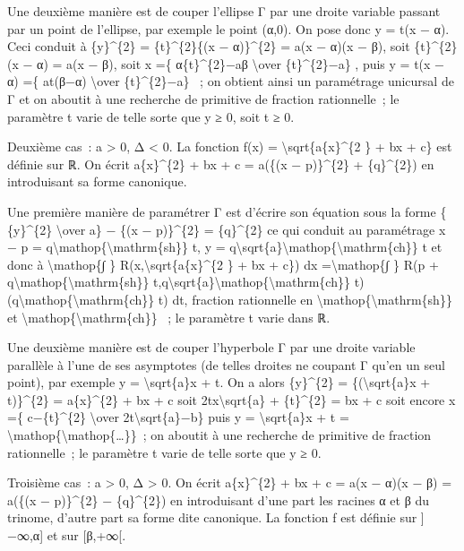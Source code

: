 \documentclass[]{article}
\begin{document}
Une deuxième manière est de couper l'ellipse Γ par une droite variable
passant par un point de l'ellipse, par exemple le point (α,0). On pose
donc y = t(x − α). Ceci conduit à \{y\}\^{}\{2\} = \{t\}\^{}\{2\}\{(x −
α)\}\^{}\{2\} = a(x − α)(x − β), soit \{t\}\^{}\{2\}(x − α) = a(x − β),
soit x =\{ α\{t\}\^{}\{2\}−aβ \textbackslash{}over \{t\}\^{}\{2\}−a\} ,
puis y = t(x − α) =\{ at(β−α) \textbackslash{}over \{t\}\^{}\{2\}−a\} ~;
on obtient ainsi un paramétrage unicursal de Γ et on aboutit à une
recherche de primitive de fraction rationnelle~; le paramètre t varie de
telle sorte que y ≥ 0, soit t ≥ 0.

Deuxième cas~: a \textgreater{} 0, Δ \textless{} 0. La fonction f(x) =
\textbackslash{}sqrt\{a\{x\}\^{}\{2 \} + bx + c\} est définie sur ℝ. On
écrit a\{x\}\^{}\{2\} + bx + c = a(\{(x − p)\}\^{}\{2\} +
\{q\}\^{}\{2\}) en introduisant sa forme canonique.

Une première manière de paramétrer Γ est d'écrire son équation sous la
forme \{ \{y\}\^{}\{2\} \textbackslash{}over a\} − \{(x − p)\}\^{}\{2\}
= \{q\}\^{}\{2\} ce qui conduit au paramétrage x − p =
q\textbackslash{}mathop\{\textbackslash{}mathrm\{sh\}\} t, y =
q\textbackslash{}sqrt\{a\}\textbackslash{}mathop\{\textbackslash{}mathrm\{ch\}\}
t et donc à \textbackslash{}mathop\{∫ \}
R(x,\textbackslash{}sqrt\{a\{x\}\^{}\{2 \} + bx + c\}) dx
=\textbackslash{}mathop\{∫ \} R(p +
q\textbackslash{}mathop\{\textbackslash{}mathrm\{sh\}\}
t,q\textbackslash{}sqrt\{a\}\textbackslash{}mathop\{\textbackslash{}mathrm\{ch\}\}
t)(q\textbackslash{}mathop\{\textbackslash{}mathrm\{ch\}\} t) dt,
fraction rationnelle en
\textbackslash{}mathop\{\textbackslash{}mathrm\{sh\}\} et
\textbackslash{}mathop\{\textbackslash{}mathrm\{ch\}\} ~; le paramètre t
varie dans ℝ.

Une deuxième manière est de couper l'hyperbole Γ par une droite variable
parallèle à l'une de ses asymptotes (de telles droites ne coupant Γ
qu'en un seul point), par exemple y = \textbackslash{}sqrt\{a\}x + t. On
a alors \{y\}\^{}\{2\} = \{(\textbackslash{}sqrt\{a\}x + t)\}\^{}\{2\} =
a\{x\}\^{}\{2\} + bx + c soit 2tx\textbackslash{}sqrt\{a\} +
\{t\}\^{}\{2\} = bx + c soit encore x =\{ c−\{t\}\^{}\{2\}
\textbackslash{}over 2t\textbackslash{}sqrt\{a\}−b\} puis y =
\textbackslash{}sqrt\{a\}x + t =
\textbackslash{}mathop\{\textbackslash{}mathop\{\ldots{}\}\}~; on
aboutit à une recherche de primitive de fraction rationnelle~; le
paramètre t varie de telle sorte que y ≥ 0.

Troisième cas~: a \textgreater{} 0, Δ \textgreater{} 0. On écrit
a\{x\}\^{}\{2\} + bx + c = a(x − α)(x − β) = a(\{(x − p)\}\^{}\{2\} −
\{q\}\^{}\{2\}) en introduisant d'une part les racines α et β du
trinome, d'autre part sa forme dite canonique. La fonction f est définie
sur {]} −∞,α{]} et sur {[}β,+∞{[}.
\end{document}
